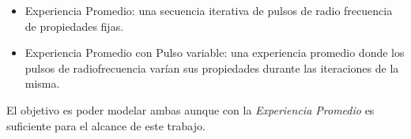 \begin{itemize}
    \item Experiencia Promedio: una secuencia iterativa de 
    pulsos de radio frecuencia de propiedades fijas.

    \item Experiencia Promedio con Pulso variable: una 
    experiencia promedio donde los pulsos de radiofrecuencia 
    var\'ian sus propiedades durante las iteraciones de la misma.

\end{itemize}

El objetivo es poder modelar ambas aunque con la \textit{Experiencia Promedio} es 
suficiente para el alcance de este trabajo.


\newpage